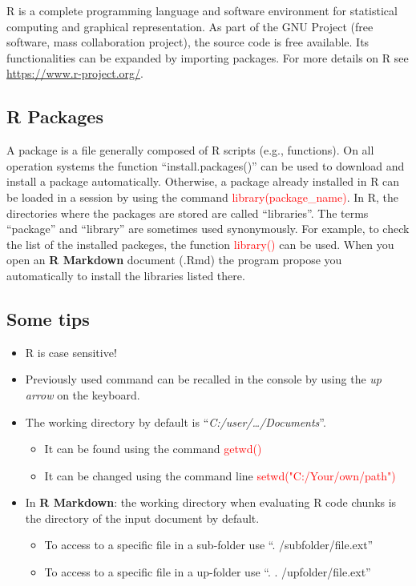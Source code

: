 \documentclass[
]{book}
\providecommand{\tightlist}{%
  \setlength{\itemsep}{0pt}\setlength{\parskip}{0pt}}
\begin{document}
R is a complete programming language and software environment for statistical computing and graphical representation.
As part of the GNU Project (free software, mass collaboration project), the source code is free available.
Its functionalities can be expanded by importing packages.
For more details on R see \url{https://www.r-project.org/}.

\hypertarget{r-packages}{%
\subsection{R Packages}\label{r-packages}}

A package is a file generally composed of R scripts (e.g., functions).
On all operation systems the function ``install.packages()'' can be used to download and install a package automatically.
Otherwise, a package already installed in R can be loaded in a session by using the command \textcolor{red}{library(package_name)}.
In R, the directories where the packages are stored are called ``libraries''. The terms ``package'' and ``library'' are sometimes used synonymously.
For example, to check the list of the installed packeges, the function \textcolor{red}{library()} can be used.
When you open an \textbf{R Markdown} document (.Rmd) the program propose you automatically to install the libraries listed there.

\hypertarget{some-tips}{%
\subsection{Some tips}\label{some-tips}}

\begin{itemize}
\tightlist
\item
  R is case sensitive!
\item
  Previously used command can be recalled in the console by using the \emph{up arrow} on the keyboard.
\item
  The working directory by default is ``\emph{C:/user/\ldots/Documents}''.

  \begin{itemize}
  \tightlist
  \item
    It can be found using the command \textcolor{red}{getwd()}
  \item
    It can be changed using the command line \textcolor{red}{setwd("C:/Your/own/path")}
  \end{itemize}
\item
  In \textbf{R Markdown}: the working directory when evaluating R code chunks is the directory of the input document by default.

  \begin{itemize}
  \tightlist
  \item
    To access to a specific file in a sub-folder use ``. /subfolder/file.ext''
  \item
    To access to a specific file in a up-folder use ``. . /upfolder/file.ext''
  \end{itemize}
\end{itemize}
\end{document}
